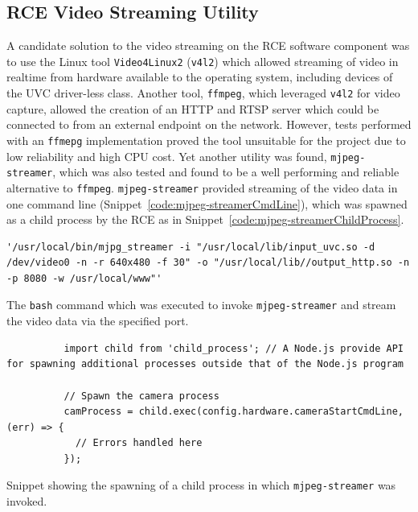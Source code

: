     \subsection{RCE Video Streaming Utility}
      A candidate solution to the video streaming on the RCE software component was to use the Linux tool \texttt{Video4Linux2} (\texttt{v4l2}) which allowed streaming of video in realtime from hardware available to the operating system, including devices of the UVC driver-less class. Another tool, \texttt{ffmpeg}, which leveraged \texttt{v4l2} for video capture, allowed the creation of an HTTP and RTSP server which could be connected to from an external endpoint on the network. However, tests performed with an \texttt{ffmepg} implementation proved the tool unsuitable for the project due to low reliability and high CPU cost. Yet another utility was found, \texttt{mjpeg-streamer}, which was also tested and found to be a well performing and reliable alternative to \texttt{ffmpeg}. \texttt{mjpeg-streamer} provided streaming of the video data in one command line (Snippet~\ref{code:mjpeg-streamerCmdLine}), which was spawned as a child process by the RCE as in Snippet~\ref{code:mjpeg-streamerChildProcess}.
      
      \begin{code}
        \begin{verbatim}
'/usr/local/bin/mjpg_streamer -i "/usr/local/lib/input_uvc.so -d /dev/video0 -n -r 640x480 -f 30" -o "/usr/local/lib//output_http.so -n -p 8080 -w /usr/local/www"'
        \end{verbatim}
        \caption{The \texttt{bash} command which was executed to invoke \texttt{mjpeg-streamer} and stream the video data via the specified port.}
        \label{code:mjpeg-streamerCmdLine}
      \end{code}
      
      \begin{code}
        \begin{verbatim}
          import child from 'child_process'; // A Node.js provide API for spawning additional processes outside that of the Node.js program
          
          // Spawn the camera process
          camProcess = child.exec(config.hardware.cameraStartCmdLine, (err) => {
            // Errors handled here
          });
        \end{verbatim}
        \caption{Snippet showing the spawning of a child process in which \texttt{mjpeg-streamer} was invoked.}
        \label{code:mjpeg-streamerChildProcess}
      \end{code}
      
      